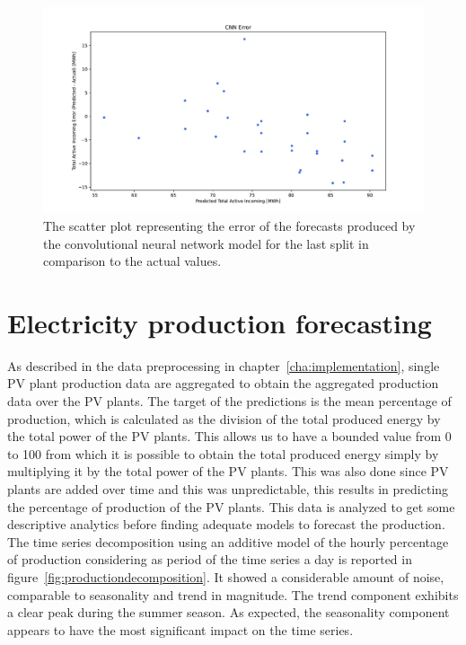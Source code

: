 \begin{figure}[H]
\centering
\includegraphics[width=1\textwidth]{images/demand/CNN_error_scatter_plot_predicted_daily_aggregated}
\caption{The scatter plot representing the error of the forecasts produced by the convolutional neural network model for the last split in comparison to the actual values.}
\label{fig:demandcnndailyforecastsscatterplot}
\end{figure}



\section{Electricity production forecasting}
\label{sec:productionval}
\vspace{0.2 cm}

As described in the data preprocessing in chapter~\ref{cha:implementation}, single PV plant production data are aggregated to obtain the aggregated production data over the PV plants.
The target of the predictions is the mean percentage of production, which is calculated as the division of the total produced energy by the total power of the PV plants.
This allows us to have a bounded value from 0 to 100 from which it is possible to obtain the total produced energy simply by multiplying it by the total power of the PV plants.
This was also done since PV plants are added over time and this was unpredictable, this results in predicting the percentage of production of the PV plants.
This data is analyzed to get some descriptive analytics before finding adequate models to forecast the production.
The time series decomposition using an additive model of the hourly percentage of production considering as period of the time series a day is reported in figure~\ref{fig:productiondecomposition}.
It showed a considerable amount of noise, comparable to seasonality and trend in magnitude.
The trend component exhibits a clear peak during the summer season.
As expected, the seasonality component appears to have the most significant impact on the time series.


